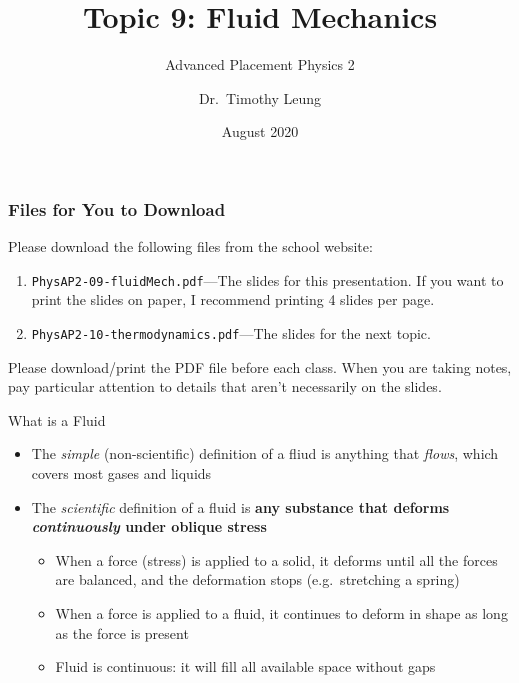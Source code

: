 \documentclass[12pt,aspectratio=169]{beamer}
\title{Topic 9: Fluid Mechanics}
\subtitle{Advanced Placement Physics 2}
\author[TML]{Dr.\ Timothy Leung}
\institute{Olympiads School}
\date{August 2020}
\begin{document}
\begin{frame}
  \maketitle
\end{frame}



\begin{frame}
  \frametitle{Files for You to Download}
  Please download the following files from the school website:
  \begin{enumerate}
  \item\texttt{PhysAP2-09-fluidMech.pdf}---The slides for this presentation. If
    you want to print the slides on paper, I recommend printing 4 slides per
    page.
  \item\texttt{PhysAP2-10-thermodynamics.pdf}---The slides for the next topic.
  \end{enumerate}
  \vspace{.2in}Please download/print the PDF file before each class. When you
  are taking notes, pay particular attention to details that aren't necessarily
  on the slides.
\end{frame}






\begin{frame}{What is a Fluid}
  \begin{itemize}
  \item The \emph{simple} (non-scientific) definition of a fliud is anything
    that \emph{flows}, which covers most gases and liquids
  \item\vspace{.1in}The \emph{scientific} definition of a fluid is \textbf{any
    substance that deforms \emph{continuously} under oblique stress}
    \begin{itemize}
    \item When a force (stress) is applied to a solid, it deforms until all the
      forces are balanced, and the deformation stops (e.g.\ stretching a spring)
    \item When a force is applied to a fluid, it continues to deform in shape as
      long as the force is present
    \item Fluid is continuous: it will fill all available space without gaps
    \end{itemize}
  \end{itemize}
\end{frame}
\end{document}

